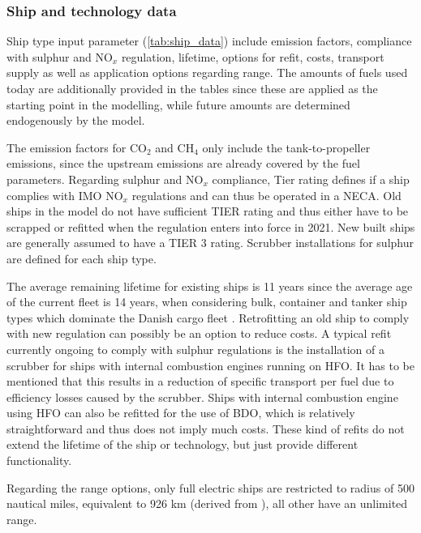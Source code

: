 \documentclass[article]{elsarticle}
\begin{document}
\subsubsection{Ship and technology data}
Ship type input parameter (\autoref{tab:ship_data}) include emission factors, compliance with sulphur and NO$_x$ regulation, lifetime, options for refit, costs, transport supply as well as application options regarding range. The amounts of fuels used today are additionally provided in the tables since these are applied as the starting point in the modelling, while future amounts are determined endogenously by the model.

The emission factors for CO$_2$ and CH$_4$ only include the tank-to-propeller emissions, since the upstream emissions are already covered by the fuel parameters. Regarding sulphur and NO$_x$ compliance, Tier rating defines if a ship complies with IMO NO$_x$ regulations and can thus be operated in a NECA. Old ships in the model do not have sufficient TIER rating and thus either have to be scrapped or refitted when the regulation enters into force in 2021. New built ships are generally assumed to have a TIER 3 rating. Scrubber installations for sulphur are defined for each ship type.

The average remaining lifetime for existing ships is 11 years since the average age of the current fleet is 14 years, when considering bulk, container and tanker ship types which dominate the Danish cargo fleet \cite[Tab.~2.2, p.~27]{UNCTAD2017}. Retrofitting an old ship to comply with new regulation can possibly be an option to reduce costs. A typical refit currently ongoing to comply with sulphur regulations is the installation of a scrubber for ships with internal combustion engines running on HFO. It has to be mentioned that this results in a reduction of specific transport per fuel due to efficiency losses caused by the scrubber. Ships with internal combustion engine using HFO can also be refitted for the use of BDO, which is relatively straightforward and thus does not imply much costs. These kind of refits do not extend the lifetime of the ship or technology, but just provide different functionality.

Regarding the range options, only full electric ships are restricted to radius of 500 nautical miles, equivalent to 926 km (derived from \cite{Stensvold2018a}), all other have an unlimited range.
\end{document}
